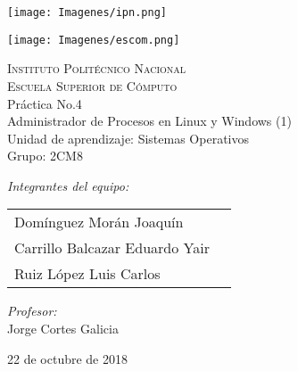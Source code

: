 \documentclass[12pt]{article}
\begin{document}
		\begin{titlepage}
			\begin{center}
				\noindent
				\begin{minipage}{0.5\textwidth}
					\begin{flushleft} \large
					\texttt{[image: Imagenes/ipn.png]}
					\end{flushleft}
				\end{minipage}%
				\begin{minipage}{0.55\textwidth}
					\begin{flushright} \large
			       	\texttt{[image: Imagenes/escom.png]}
					\end{flushright}
				\end{minipage}
				\textsc{\LARGE Instituto Politécnico Nacional}\\[0.5cm]
				\textsc{\Large Escuela Superior de Cómputo}\\[1cm]
				{ \huge Práctica No.4 \\[1cm] }
				{\huge Administrador de Procesos en Linux y Windows (1)\\[1cm]}
				{ \Large Unidad de aprendizaje: Sistemas Operativos} \\[1cm]
				{ \Large Grupo: 2CM8 } \\[1cm]
				\noindent
				\begin{minipage}{0.5\textwidth}
					\begin{flushleft} \large
						\emph{Integrantes del equipo:}\\
						\begin{tabular}{ll}
					     Domínguez Morán Joaquín\\
					     Carrillo Balcazar Eduardo Yair\\
					     Ruiz López Luis Carlos\\
					\end{tabular}
					\end{flushleft}
				\end{minipage}%
				\begin{minipage}{0.5\textwidth}
					\begin{flushright} \large
						\emph{Profesor:} \\
						Jorge Cortes Galicia 
					\end{flushright}
				\end{minipage}
				
				\vfill
				{\large 22 de octubre de 2018}
			\end{center}
		\end{titlepage}
		
\end{document}
